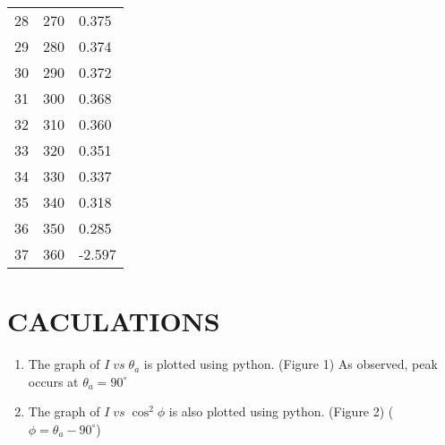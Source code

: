 \documentclass[11pt,a4paper]{article}
\begin{document}
\begin{table}[]
\begin{tabular}{@{}lll@{}}
28                        & 270                                                                                       & 0.375                                                                       \\
29                        & 280                                                                                       & 0.374                                                                       \\
30                        & 290                                                                                       & 0.372                                                                       \\
31                        & 300                                                                                       & 0.368                                                                       \\
32                        & 310                                                                                       & 0.360                                                                       \\
33                        & 320                                                                                       & 0.351                                                                       \\
34                        & 330                                                                                       & 0.337                                                                       \\
35                        & 340                                                                                       & 0.318                                                                       \\
36                        & 350                                                                                       & 0.285                                                                       \\
37                        & 360                                                                                       & -2.597                                                                      \\ \bottomrule
\end{tabular}
\end{table}


\section*{CACULATIONS}
\begin{enumerate}
\item The graph of $I \; vs \; \theta_{a}$ is plotted using python. (Figure 1) As observed, peak occurs at $\theta_{a} = 90^{\circ}$
\item The graph of $I \;vs\; \cos^{2}\phi$ is also plotted using python. (Figure 2)  ($\phi = \theta_{a} - 90^{\circ}$)
\end{enumerate}
\end{document}
